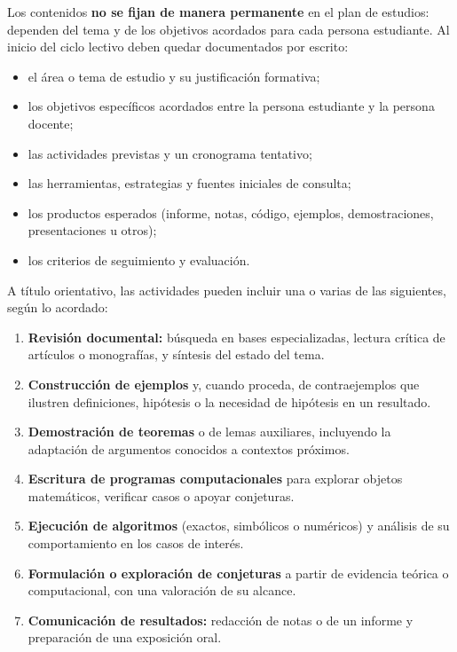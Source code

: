 \begin{refsection}
Los contenidos \textbf{no se fijan de manera permanente} en el plan de estudios: dependen del tema y de los objetivos acordados para cada persona estudiante. Al inicio del ciclo lectivo deben quedar documentados por escrito:

\begin{itemize}
\item el área o tema de estudio y su justificación formativa;
\item los objetivos específicos acordados entre la persona estudiante y la persona docente;
\item las actividades previstas y un cronograma tentativo;
\item las herramientas, estrategias y fuentes iniciales de consulta;
\item los productos esperados (informe, notas, código, ejemplos, demostraciones, presentaciones u otros);
\item los criterios de seguimiento y evaluación.
\end{itemize}

A título orientativo, las actividades pueden incluir una o varias de las siguientes, según lo acordado:

\begin{enumerate}
\item \textbf{Revisión documental:} búsqueda en bases especializadas, lectura crítica de artículos o monografías, y síntesis del estado del tema.
\item \textbf{Construcción de ejemplos} y, cuando proceda, de contraejemplos que ilustren definiciones, hipótesis o la necesidad de hipótesis en un resultado.
\item \textbf{Demostración de teoremas} o de lemas auxiliares, incluyendo la adaptación de argumentos conocidos a contextos próximos.
\item \textbf{Escritura de programas computacionales} para explorar objetos matemáticos, verificar casos o apoyar conjeturas.
\item \textbf{Ejecución de algoritmos} (exactos, simbólicos o numéricos) y análisis de su comportamiento en los casos de interés.
\item \textbf{Formulación o exploración de conjeturas} a partir de evidencia teórica o computacional, con una valoración de su alcance.
\item \textbf{Comunicación de resultados:} redacción de notas o de un informe y preparación de una exposición oral.
\end{enumerate}


\end{refsection}
